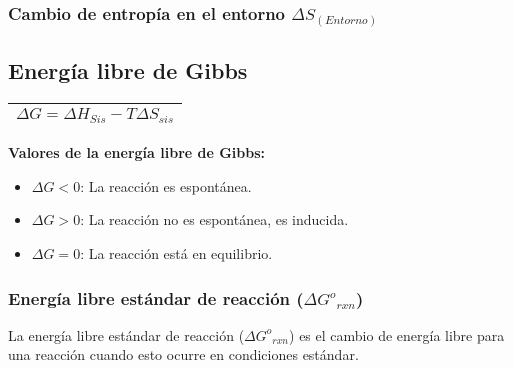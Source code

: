         \subsubsection{Cambio de entropía en el entorno $\Delta S_{(Entorno)}$}
        \subsection{Energía libre de Gibbs}
            \begin{center}
            \begin{tabular} {|m{5cm}|}
                \hline
                $\Delta G = \Delta H_{Sis} - T \Delta S_{sis}$ \\
                \hline
            \end{tabular}
            \end{center}
            \textbf{Valores de la energía libre de Gibbs:}
            \begin{itemize}
                \item $\Delta G < 0$: La reacción es espontánea.
                \item $\Delta G > 0$: La reacción no es espontánea, es inducida. 
                \item $\Delta G = 0$: La reacción está en equilibrio.
            \end{itemize}
            \subsubsection{Energía libre estándar de reacción ($\Delta {G^o}_{rxn}$)}
            \sangria{} La energía libre estándar de reacción ($\Delta {G^o}_{rxn}$) es el cambio de energía libre para una reacción cuando esto ocurre en condiciones estándar.

